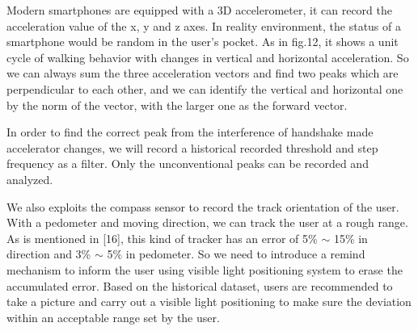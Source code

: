 \documentclass[conference]{IEEEtran}
\begin{document}
Modern smartphones are equipped with a 3D accelerometer, it can record the acceleration value of the x, y and z axes. In reality environment, the status of a smartphone would be random in the user's pocket. As in fig.12, it shows a unit cycle of walking behavior with changes in vertical and horizontal acceleration. So we can always sum the three acceleration vectors and find two peaks which are perpendicular to each other, and we can identify the vertical and horizontal one by the norm of the vector, with the larger one as the forward vector.

In order to find the correct peak from the interference of handshake made accelerator changes, we will record a historical recorded threshold and step frequency as a filter. Only the unconventional peaks can be recorded and analyzed.

We also exploits the compass sensor to record the track orientation of the user. With a pedometer and moving direction, we can track the user at a rough range. As is mentioned in [16], this kind of tracker has an error of 5\% $\sim$ 15\% in direction and 3\% $\sim$ 5\% in pedometer. So we need to introduce a remind mechanism to inform the user using visible light positioning system to erase the accumulated error. Based on the historical dataset, users are recommended to take a picture and carry out a visible light positioning to make sure the deviation within an acceptable range set by the user.
\end{document}
